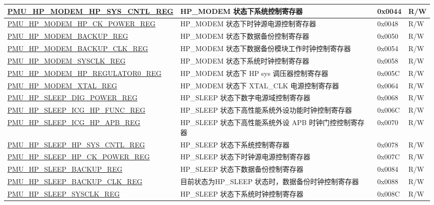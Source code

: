 \begin{longtable}{ | l | L{6cm} | l | l | }
\hyperref[regdesc:PMUHPMODEMHPSYSCNTLREG]{PMU\_HP\_MODEM\_HP\_SYS\_CNTL\_REG} & HP\_MODEM 状态下系统控制寄存器 & 0x0044 & R/W \\ \hline
\hyperref[regdesc:PMUHPMODEMHPCKPOWERREG]{PMU\_HP\_MODEM\_HP\_CK\_POWER\_REG} & HP\_MODEM 状态下时钟源电源控制寄存器 & 0x0048 & R/W \\ \hline
\hyperref[regdesc:PMUHPMODEMBACKUPREG]{PMU\_HP\_MODEM\_BACKUP\_REG} & HP\_MODEM 状态下数据备份控制寄存器 & 0x0050 & R/W \\ \hline
\hyperref[regdesc:PMUHPMODEMBACKUPCLKREG]{PMU\_HP\_MODEM\_BACKUP\_CLK\_REG} & HP\_MODEM 状态下数据备份模块工作时钟控制寄存器 & 0x0054 & R/W \\ \hline
\hyperref[regdesc:PMUHPMODEMSYSCLKREG]{PMU\_HP\_MODEM\_SYSCLK\_REG} & HP\_MODEM 状态下系统时钟控制寄存器  & 0x0058 & R/W \\ \hline
\hyperref[regdesc:PMUHPMODEMHPREGULATOR0REG]{PMU\_HP\_MODEM\_HP\_REGULATOR0\_REG} & HP\_MODEM 状态下 HP sys 调压器控制寄存器 & 0x005C & R/W \\ \hline
\hyperref[regdesc:PMUHPMODEMXTALREG]{PMU\_HP\_MODEM\_XTAL\_REG} & HP\_MODEM 状态下 XTAL\_CLK 电源控制寄存器 & 0x0064 & R/W \\ \hline
\hyperref[regdesc:PMUHPSLEEPDIGPOWERREG]{PMU\_HP\_SLEEP\_DIG\_POWER\_REG} & HP\_SLEEP 状态下数字电源域控制寄存器 & 0x0068 & R/W \\ \hline
\hyperref[regdesc:PMUHPSLEEPICGHPFUNCREG]{PMU\_HP\_SLEEP\_ICG\_HP\_FUNC\_REG} & HP\_SLEEP 状态下高性能系统外设功能时钟控制寄存器 & 0x006C & R/W \\ \hline
\hyperref[regdesc:PMUHPSLEEPICGHPAPBREG]{PMU\_HP\_SLEEP\_ICG\_HP\_APB\_REG} & HP\_SLEEP 状态下高性能系统外设 APB 时钟门控控制寄存器& 0x0070 & R/W \\ \hline
\hyperref[regdesc:PMUHPSLEEPHPSYSCNTLREG]{PMU\_HP\_SLEEP\_HP\_SYS\_CNTL\_REG} & HP\_SLEEP 状态下系统控制寄存器 & 0x0078 & R/W \\ \hline
\hyperref[regdesc:PMUHPSLEEPHPCKPOWERREG]{PMU\_HP\_SLEEP\_HP\_CK\_POWER\_REG} & HP\_SLEEP 状态下时钟源电源控制寄存器 & 0x007C & R/W \\ \hline
\hyperref[regdesc:PMUHPSLEEPBACKUPREG]{PMU\_HP\_SLEEP\_BACKUP\_REG} & HP\_SLEEP 状态下数据备份控制寄存器 & 0x0084 & R/W \\ \hline
\hyperref[regdesc:PMUHPSLEEPBACKUPCLKREG]{PMU\_HP\_SLEEP\_BACKUP\_CLK\_REG} & 目前状态为HP\_SLEEP 状态时，数据备份时钟控制寄存器 & 0x0088 & R/W \\ \hline
\hyperref[regdesc:PMUHPSLEEPSYSCLKREG]{PMU\_HP\_SLEEP\_SYSCLK\_REG} & HP\_SLEEP 状态下系统时钟控制寄存器  & 0x008C & R/W \\ \hline

\end{longtable}
